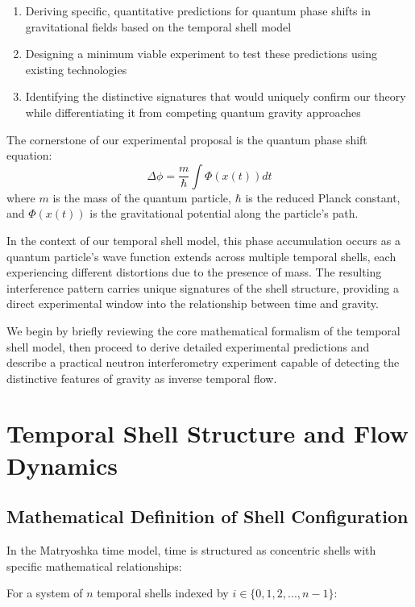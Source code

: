 \documentclass[12pt,a4paper]{article}
\begin{document}
\begin{enumerate}
    \item Deriving specific, quantitative predictions for quantum phase shifts in gravitational fields based on the temporal shell model
    \item Designing a minimum viable experiment to test these predictions using existing technologies
    \item Identifying the distinctive signatures that would uniquely confirm our theory while differentiating it from competing quantum gravity approaches
\end{enumerate}

The cornerstone of our experimental proposal is the quantum phase shift equation:
\begin{equation}
\Delta \phi = \frac{m}{\hbar} \int \Phi(x(t)) dt
\end{equation}
where $m$ is the mass of the quantum particle, $\hbar$ is the reduced Planck constant, and $\Phi(x(t))$ is the gravitational potential along the particle's path.

In the context of our temporal shell model, this phase accumulation occurs as a quantum particle's wave function extends across multiple temporal shells, each experiencing different distortions due to the presence of mass. The resulting interference pattern carries unique signatures of the shell structure, providing a direct experimental window into the relationship between time and gravity.

We begin by briefly reviewing the core mathematical formalism of the temporal shell model, then proceed to derive detailed experimental predictions and describe a practical neutron interferometry experiment capable of detecting the distinctive features of gravity as inverse temporal flow.

\section{Temporal Shell Structure and Flow Dynamics}

\subsection{Mathematical Definition of Shell Configuration}

In the Matryoshka time model, time is structured as concentric shells with specific mathematical relationships:

For a system of $n$ temporal shells indexed by $i \in \{0, 1, 2, ..., n-1\}$:
\end{document}
